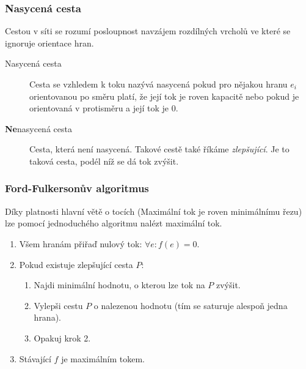 \subsubsection{Nasycená cesta}

Cestou v síti se rozumí posloupnost navzájem rozdílných vrcholů ve které se ignoruje orientace hran.

\begin{description}
    \item[Nasycená cesta] Cesta se vzhledem k toku nazývá nasycená pokud pro nějakou hranu $e_i$ orientovanou po směru platí, že její tok je roven kapacitě nebo pokud je orientovaná v protisměru a její tok je $0$.
    \item[\textbf{Ne}nasycená cesta] Cesta, která není nasycená.
    Takové cestě také říkáme \textit{zlepšující}.
    Je to taková cesta, podél níž se dá tok zvýšit.
\end{description}


\subsubsection{Ford-Fulkersonův algoritmus}\label{alg:ford-fulkerson}

Díky platnosti hlavní větě o tocích (Maximální tok je roven minimálnímu řezu) lze pomocí jednoduchého algoritmu nalézt maximální tok.

\begin{enumerate}
    \item Všem hranám přiřaď nulový tok: $\forall e: f(e) = 0$.
    \item Pokud existuje zlepšující cesta $P$:
    \begin{enumerate}
        \item Najdi minimální hodnotu, o kterou lze tok na $P$ zvýšit.
        \item Vylepši cestu $P$ o nalezenou hodnotu (tím se saturuje alespoň jedna hrana).
        \item Opakuj krok 2.
    \end{enumerate}
    \item Stávající $f$ je maximálním tokem.
\end{enumerate}
